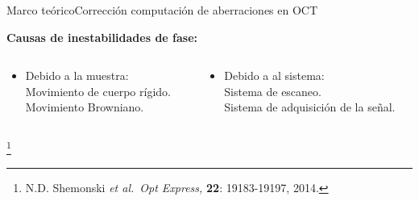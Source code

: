 \documentclass[fleqn,10pt,aspectratio=169,dvipsnames]{beamer}
\newcommand\blfootnote[1]{%
	\begingroup
	\renewcommand\thefootnote{}\footnote{#1}%
	\addtocounter{footnote}{-1}%
	\endgroup
}
\newcommand{\etal}{\textit{et al.}\ }
\begin{document}
\begin{frame}[c]{Marco teórico}{Corrección computación de aberraciones en OCT}
{	\vspace{\baselineskip}
\textbf{Causas de inestabilidades de fase:}
	\begin{columns}
		\begin{column}{.5\textwidth}
			\begin{itemize}
\item Debido a la muestra: \\
\hspace{.5\baselineskip} Movimiento de cuerpo rígido. \\
\hspace{.5\baselineskip} Movimiento Browniano.
			\end{itemize}
		\end{column}
		\begin{column}{.5\textwidth}
			\begin{itemize}
\item Debido a al sistema: \\ 
\hspace{.5\baselineskip} Sistema de escaneo. \\
\hspace{.5\baselineskip} Sistema de adquisición de la señal.
			\end{itemize}
		\end{column}
	\end{columns}
}
\blfootnote{\tiny{N.D. Shemonski \etal \emph{Opt Express,} \textbf{22}: 19183-19197, 2014.}}
\end{frame}
\end{document}
